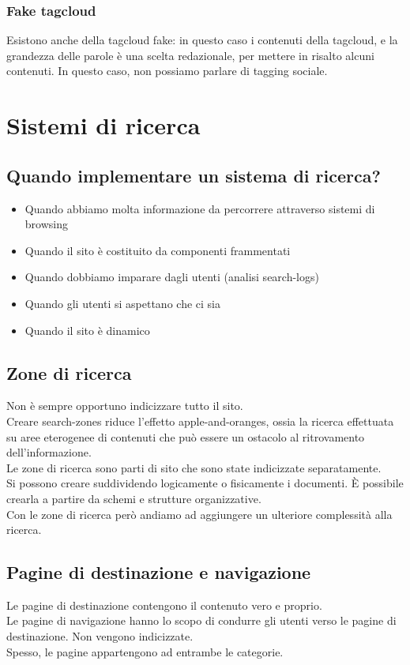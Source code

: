\documentclass{article}
\begin{document}
\subsubsection{Fake tagcloud}
Esistono anche della tagcloud fake: in questo caso i contenuti della tagcloud, e la grandezza delle parole è una scelta redazionale, per mettere in risalto alcuni contenuti. In questo caso, non possiamo parlare di tagging sociale.
\section{Sistemi di ricerca}
\subsection{Quando implementare un sistema di ricerca?}
\begin{itemize}
	\item Quando abbiamo molta informazione da percorrere attraverso sistemi di browsing
	\item Quando il sito è costituito da componenti frammentati
	\item Quando dobbiamo imparare dagli utenti (analisi search-logs)
	\item Quando gli utenti si aspettano che ci sia
	\item Quando il sito è dinamico
\end{itemize}
\subsection{Zone di ricerca}
Non è sempre opportuno indicizzare tutto il sito.\\
Creare search-zones riduce l'effetto apple-and-oranges, ossia la ricerca effettuata su aree eterogenee di contenuti che può essere un ostacolo al ritrovamento dell'informazione.\\
Le zone di ricerca sono parti di sito che sono state indicizzate separatamente.\\
Si possono creare suddividendo logicamente o fisicamente i documenti. È possibile crearla a partire da schemi e strutture organizzative.\\
Con le zone di ricerca però andiamo ad aggiungere un ulteriore complessità alla ricerca.
\subsection{Pagine di destinazione e navigazione}
Le pagine di destinazione contengono il contenuto vero e proprio.\\
Le pagine di navigazione hanno lo scopo di condurre gli utenti verso le pagine di destinazione. Non vengono indicizzate.\\
Spesso, le pagine appartengono ad entrambe le categorie.
\end{document}
